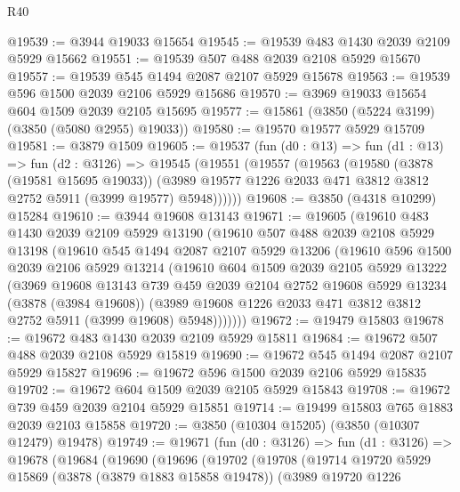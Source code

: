 \begin{lexlean}{R40}
\begin{coremodule}
@19539 := @3944 @19033 @15654
@19545 := @19539 @483 @1430 @2039 @2109 @5929 @15662
@19551 := @19539 @507 @488 @2039 @2108 @5929 @15670
@19557 := @19539 @545 @1494 @2087 @2107 @5929 @15678
@19563 := @19539 @596 @1500 @2039 @2106 @5929 @15686
@19570 := @3969 @19033 @15654 @604 @1509 @2039 @2105 @15695
@19577 := @15861 (@3850 (@5224 @3199) (@3850 (@5080 @2955) @19033))
@19580 := @19570 @19577 @5929 @15709
@19581 := @3879 @1509
@19605 := @19537
    (fun (d0 : @13) =>
    fun (d1 : @13) =>
    fun (d2 : @3126) =>
    @19545
      (@19551
        (@19557
          (@19563
            (@19580
              (@3878 (@19581 @15695 @19033))
              (@3989 @19577 @1226 @2033 @471 @3812 @3812 @2752 @5911 (@3999 @19577) @5948))))))
@19608 := @3850 (@4318 @10299) @15284
@19610 := @3944 @19608 @13143
@19671 := @19605
    (@19610
      @483
      @1430
      @2039
      @2109
      @5929
      @13190
      (@19610
        @507
        @488
        @2039
        @2108
        @5929
        @13198
        (@19610
          @545
          @1494
          @2087
          @2107
          @5929
          @13206
          (@19610
            @596
            @1500
            @2039
            @2106
            @5929
            @13214
            (@19610
              @604
              @1509
              @2039
              @2105
              @5929
              @13222
              (@3969
                @19608
                @13143
                @739
                @459
                @2039
                @2104
                @2752
                @19608
                @5929
                @13234
                (@3878 (@3984 @19608))
                (@3989 @19608 @1226 @2033 @471 @3812 @3812 @2752 @5911 (@3999 @19608) @5948)))))))
@19672 := @19479 @15803
@19678 := @19672 @483 @1430 @2039 @2109 @5929 @15811
@19684 := @19672 @507 @488 @2039 @2108 @5929 @15819
@19690 := @19672 @545 @1494 @2087 @2107 @5929 @15827
@19696 := @19672 @596 @1500 @2039 @2106 @5929 @15835
@19702 := @19672 @604 @1509 @2039 @2105 @5929 @15843
@19708 := @19672 @739 @459 @2039 @2104 @5929 @15851
@19714 := @19499 @15803 @765 @1883 @2039 @2103 @15858
@19720 := @3850 (@10304 @15205) (@3850 (@10307 @12479) @19478)
@19749 := @19671
    (fun (d0 : @3126) =>
    fun (d1 : @3126) =>
    @19678
      (@19684
        (@19690
          (@19696
            (@19702
              (@19708
                (@19714
                  @19720
                  @5929
                  @15869
                  (@3878 (@3879 @1883 @15858 @19478))
                  (@3989
                    @19720
                    @1226

\end{coremodule}
\end{lexlean}
